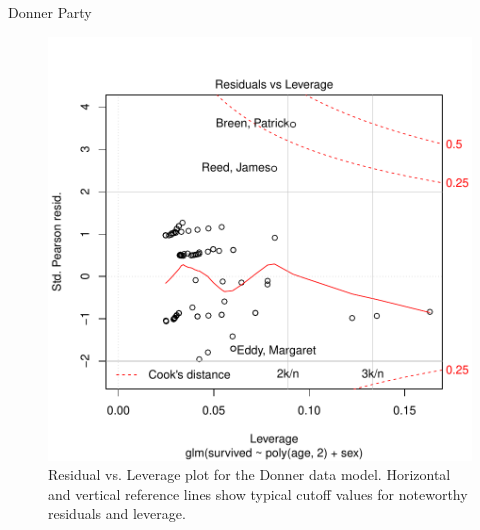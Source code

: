 \documentclass[11pt]{book}
\renewenvironment{knitrout}{\small\renewcommand{\baselinestretch}{.85}}{} %
\begin{document}
\begin{Example}[donner2]{Donner Party}
\begin{knitrout}
\color{fgcolor}\begin{kframe}
\begin{alltt}
 \hlkwb{<-} \hlstd{(}\hlstd{=}\hlstd{(}\hlstd{,}\hlstd{,}\hlstd{,}\hlstd{)}\hlopt{+}\hlstd{)}
 \hlstd{=}\hlstd{,} \hlstd{=}\hlstd{,} \hlstd{=}\hlstd{(}\hlstd{,} \hlstd{),} \hlstd{=}\hlstd{)}
\hlstd{(}\hlstd{=}\hlstd{(}\hlopt{-}\hlstd{,} \hlstd{),} \hlstd{=}\hlstd{)}
 \hlkwb{<-} \hlstd{(}
 \hlkwb{<-} 
\hlstd{(}\hlstd{=}\hlstd{(}\hlstd{,} \hlstd{)}\hlopt{*}\hlopt{/} \hlstd{=}\hlstd{)}
\hlstd{(}\hlstd{=}\hlstd{(}\hlstd{,} \hlstd{)}\hlopt{*}\hlopt{/} \hlstd{=}\hlopt{-}\hlstd{,} \hlstd{(}\hlstd{,} \hlstd{))}
\end{alltt}
\end{kframe}\begin{figure}[!htbp]


\centerline{\includegraphics[width=.6\textwidth]{ch07/fig/donner2-plot5} }

\caption[Residual vs]{Residual vs. Leverage plot for the Donner data model. Horizontal and vertical reference lines show typical cutoff values for noteworthy residuals and leverage.\label{fig:donner2-plot5}}
\end{figure}



\end{knitrout}
\end{Example}
\end{document}
